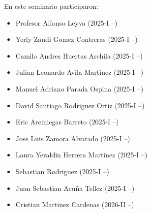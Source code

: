 En este seminario participaron:

\begin{itemize}
	\item Profesor Alfonso Leyva (2025-I --)
	\item Yerly Zaudi Gomez Contreras (2025-I --)
	\item Camilo Andres Huertas Archila (2025-I --)
	\item Julian Leonardo Avila Martinez (2025-I --)
	\item Manuel Adriano Parada Ospina (2025-I --)
	\item David Santiago Rodriguez Ortiz (2025-I --)
	\item Eric Arciniegas Barreto (2025-I --)
	\item Jose Luis Zamora Alvarado (2025-I --)
	\item Laura Yeraldin Herrera Martinez (2025-I --)
	\item Sebastian Rodriguez (2025-I --)
	\item Juan Sebastian Acuña Tellez (2025-I --)
	\item Cristian Martinez Cardenas (2026-II --)
\end{itemize}
